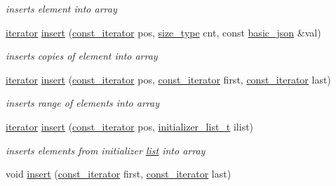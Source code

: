 \begin{DoxyCompactItemize}
\begin{DoxyCompactList}\small\item\em inserts element into array \end{DoxyCompactList}\item 
\hyperlink{classnlohmann_1_1basic__json_aa549b2b382916b3baafb526e5cb410bd}{iterator} \hyperlink{classnlohmann_1_1basic__json_a71e197e6cc78c3960011f68a75f8ef22}{insert} (\hyperlink{classnlohmann_1_1basic__json_aebd2cfa7e4ded4e97cde9269bfeeea38}{const\+\_\+iterator} pos, \hyperlink{classnlohmann_1_1basic__json_a3ada29bca70b4965f6fd37ec1c8f85f7}{size\+\_\+type} cnt, const \hyperlink{classnlohmann_1_1basic__json}{basic\+\_\+json} \&val)
\begin{DoxyCompactList}\small\item\em inserts copies of element into array \end{DoxyCompactList}\item 
\hyperlink{classnlohmann_1_1basic__json_aa549b2b382916b3baafb526e5cb410bd}{iterator} \hyperlink{classnlohmann_1_1basic__json_a8137d5471edcd71606e42155ed9c23e2}{insert} (\hyperlink{classnlohmann_1_1basic__json_aebd2cfa7e4ded4e97cde9269bfeeea38}{const\+\_\+iterator} pos, \hyperlink{classnlohmann_1_1basic__json_aebd2cfa7e4ded4e97cde9269bfeeea38}{const\+\_\+iterator} first, \hyperlink{classnlohmann_1_1basic__json_aebd2cfa7e4ded4e97cde9269bfeeea38}{const\+\_\+iterator} last)
\begin{DoxyCompactList}\small\item\em inserts range of elements into array \end{DoxyCompactList}\item 
\hyperlink{classnlohmann_1_1basic__json_aa549b2b382916b3baafb526e5cb410bd}{iterator} \hyperlink{classnlohmann_1_1basic__json_a856b8764efd21dac4205a00fec82e09a}{insert} (\hyperlink{classnlohmann_1_1basic__json_aebd2cfa7e4ded4e97cde9269bfeeea38}{const\+\_\+iterator} pos, \hyperlink{classnlohmann_1_1basic__json_ac569f292a070dfd2f6b69c16e746095a}{initializer\+\_\+list\+\_\+t} ilist)
\begin{DoxyCompactList}\small\item\em inserts elements from initializer \hyperlink{protocollist-p}{list} into array \end{DoxyCompactList}\item 
void \hyperlink{classnlohmann_1_1basic__json_a0181d03c6314bedcbad2e92d3676223c}{insert} (\hyperlink{classnlohmann_1_1basic__json_aebd2cfa7e4ded4e97cde9269bfeeea38}{const\+\_\+iterator} first, \hyperlink{classnlohmann_1_1basic__json_aebd2cfa7e4ded4e97cde9269bfeeea38}{const\+\_\+iterator} last)

\end{DoxyCompactItemize}
